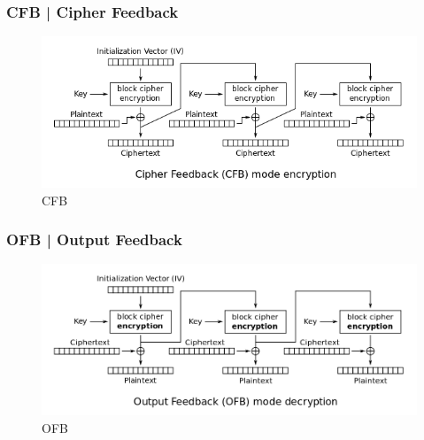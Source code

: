 \subsubsection{CFB | Cipher Feedback}


\textsf{\small }

\begin{figure}[H]
	\centering
	\includegraphics[width=1\textwidth, height=1\textheight, keepaspectratio]{./images/aes_modes/cfb.png} %
	\caption{CFB}
	\label{fig:cfb}
\end{figure}

\subsubsection{OFB | Output Feedback}

\begin{figure}[H]
	\centering
	\includegraphics[width=1\textwidth, height=1\textheight, keepaspectratio]{./images/aes_modes/ofb.png} %
	\caption{OFB}
	\label{fig:ofb}
\end{figure}



